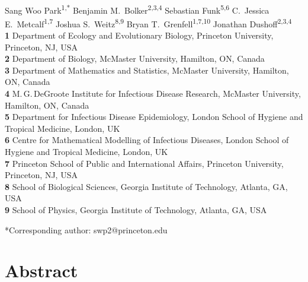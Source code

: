 \documentclass[12pt]{article}
\date{\today}
\begin{document}
\begin{flushleft}{
	\Large
	\textbf{}
}
\newline
\\
Sang Woo Park\textsuperscript{1,*}
Benjamin M.\ Bolker\textsuperscript{2,3,4}
Sebastian Funk\textsuperscript{5,6}
C.\ Jessica E.\ Metcalf\textsuperscript{1,7}
Joshua S.\ Weitz\textsuperscript{8,9}
Bryan T.\ Grenfell\textsuperscript{1,7,10}
Jonathan Dushoff\textsuperscript{2,3,4}
\\
\bigskip
\textbf{1} Department of Ecology and Evolutionary Biology, Princeton University, Princeton, NJ, USA
\\
\textbf{2} Department of Biology, McMaster University, Hamilton, ON, Canada
\\
\textbf{3} Department of Mathematics and Statistics, McMaster University, Hamilton, ON, Canada
\\
\textbf{4} M.\,G.\,DeGroote Institute for Infectious Disease Research, McMaster University, Hamilton, ON, Canada
\\
\textbf{5} Department for Infectious Disease Epidemiology, London School of Hygiene and Tropical Medicine, London, UK
\\
\textbf{6} Centre for Mathematical Modelling of Infectious Diseases, London School of Hygiene and Tropical Medicine, London, UK
\\
\textbf{7} Princeton School of Public and International Affairs, Princeton University, Princeton, NJ, USA
\\
\textbf{8} School of Biological Sciences, Georgia Institute of Technology, Atlanta, GA, USA
\\
\textbf{9} School of Physics, Georgia Institute of Technology, Atlanta, GA, USA
\\
\bigskip

*Corresponding author: swp2@princeton.edu
\bigskip

\end{flushleft}


\section*{Abstract}
\end{document}
